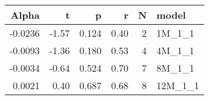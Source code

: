 \begin{table}[ht]
\centering
\begin{tabular}{rrrrrl}
  \hline
Alpha & t & p & r & N & model \\ 
  \hline
-0.0236 & -1.57 & 0.124 & 0.40 & 2 & 1M\_1\_1 \\ 
  -0.0093 & -1.36 & 0.180 & 0.53 & 4 & 4M\_1\_1 \\ 
  -0.0034 & -0.64 & 0.524 & 0.70 & 7 & 8M\_1\_1 \\ 
  0.0021 & 0.40 & 0.687 & 0.68 & 8 & 12M\_1\_1 \\ 
   \hline
\end{tabular}
\end{table}


